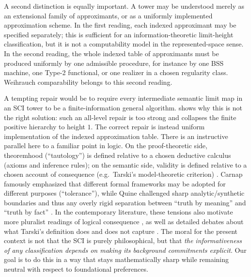 \documentclass{lmcs} %
\theoremstyle{plain}
\theoremstyle{plain}
\theoremstyle{definition}
\theoremstyle{remark}
\theoremstyle{definition}
\theoremstyle{remark}
\numberwithin{equation}{section}
\begin{document}
A second distinction is equally important. A tower may be understood merely as an
extensional family of approximants, or as a uniformly implemented approximation
scheme.  In the first reading, each indexed approximant may be specified separately;
this is sufficient for an information-theoretic limit-height classification, but it is not
a computability model in the represented-space sense. In the second reading, the
whole indexed table of approximants must be produced uniformly by one admissible
procedure, for instance by one BSS machine, one Type-2 functional, or one realizer in
a chosen regularity class. Weihrauch comparability belongs to this second reading.

A tempting repair would be to require every intermediate semantic limit map in an
SCI tower to be a finite-information general algorithm.  shows why this is
not the right solution: such an all-level repair is too strong and collapses the finite
positive hierarchy to height \(1\). The correct repair is instead uniform
implementation of the indexed approximation table.
There is an instructive parallel here to a familiar point in logic.
On the proof-theoretic side, theoremhood (\enquote{tautology}) is defined relative to a chosen
deductive calculus (axioms and inference rules); on the semantic side, validity is defined
relative to a chosen account of consequence (e.g.\ Tarski's model-theoretic criterion)
\cite{Tarski02,shapiro1998logical}.
Carnap famously emphasized that different formal frameworks may be adopted for different
purposes (\enquote{tolerance}), while Quine challenged sharp analytic/synthetic boundaries and
thus any overly rigid separation between \enquote{truth by meaning} and \enquote{truth by fact}
\cite{carnap2014logical,quine2000two}.
In the contemporary literature, these tensions also motivate more pluralist readings of
logical consequence \cite{beall2000logical}, as well as detailed debates about what Tarski's
definition does and does not capture \cite{etchemendy1990concept}.
The moral for the present context is not that the SCI is purely philosophical, but that \textit{the
informativeness of any classification depends on making its background commitments explicit}.
Our goal is to do this in a way that stays mathematically sharp while remaining neutral with
respect to foundational preferences.
\end{document}
